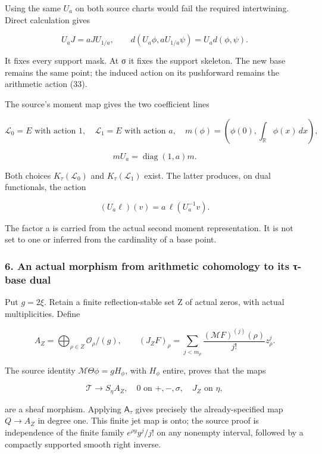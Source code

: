 \documentclass{article}
\begin{document}
Using the same \(U_a\) on both source charts would fail the required intertwining. Direct calculation gives

\[
U_aJ=aJU_{1/a},\qquad d(U_a\phi,aU_{1/a}\psi)=U_a d(\phi,\psi).
\tag{35}
\]

It fixes every support mask. At σ it fixes the support skeleton. The new base remains the same point; the induced action on its pushforward remains the arithmetic action (33).

The source's moment map gives the two coefficient lines

\[
\mathcal L_0=E\text{ with action }1,\quad
\mathcal L_1=E\text{ with action }a,
\quad
m(\phi)=(\phi(0),\int_{\mathbb R}\phi(x)\,dx),
\tag{36}
\]

\[
mU_a=\operatorname{diag}(1,a)m.
\]

Both choices \(K_\tau(\mathcal L_0)\) and \(K_\tau(\mathcal L_1)\) exist. The latter produces, on dual functionals, the action

\[
(U_a\ell)(v)=a\,\ell(U_a^{-1}v).
\tag{37}
\]

The factor a is carried from the actual second moment representation. It is not set to one or inferred from the cardinality of a base point.

\subsubsection{6. An actual morphism from arithmetic cohomology to its τ-base dual}\label{endpoint-tau_base--an-actual-morphism-from-arithmetic-cohomology-to-its-ux3c4-base-dual}

Put \(g=2\xi\). Retain a finite reflection-stable set Z of actual zeros, with actual multiplicities. Define

\[
A_Z=\bigoplus_{\rho\in Z}\mathcal O_\rho/(g),
\qquad
(J_ZF)_\rho=\sum_{j<m_\rho}
\frac{(\mathcal MF)^{(j)}(\rho)}{j!}z_\rho^j.
\tag{38}
\]

The source identity \(\mathcal M\Theta\phi=gH_\phi\), with \(H_\phi\) entire, proves that the maps

\[
\mathcal T\longrightarrow S_\eta A_Z,
\quad 0\text{ on }+, -,\sigma,\quad J_Z\text{ on }\eta,
\tag{39}
\]

are a sheaf morphism. Applying \(\mathsf A_\tau\) gives precisely the already-specified map \(Q\to A_Z\) in degree one. This finite jet map is onto; the source proof is independence of the finite family \(e^{\rho y}y^j/j!\) on any nonempty interval, followed by a compactly supported smooth right inverse.
\end{document}
